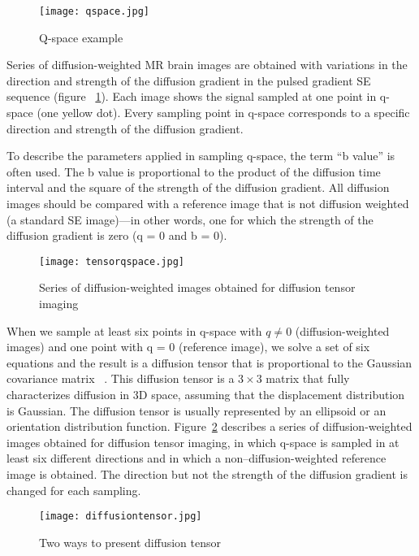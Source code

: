 \begin{figure} 
  \centering 
  \texttt{[image: qspace.jpg]}
  \caption{Q-space example}
  \label{Fig:qspace}
\end{figure}

Series of diffusion-weighted MR brain images are obtained with variations in the direction and strength of the diffusion gradient in the pulsed gradient SE sequence (figure ~\ref{Fig:qspace}). Each image shows the signal sampled at one point in q-space (one yellow dot). Every sampling point in q-space corresponds to a specific direction and strength of the diffusion gradient.

To describe the parameters applied in sampling q-space, the term “b value” is often used. The b value is proportional to the product of the diffusion time interval and the square of the strength of the diffusion gradient. All diffusion images should be compared with a reference image that is not diffusion weighted (a standard SE image)—in other words, one for which the strength of the diffusion gradient is zero (q = 0 and b = 0).

\begin{figure} 
  \centering 
  \texttt{[image: tensorqspace.jpg]}
  \caption{Series of diffusion-weighted images obtained for diffusion tensor imaging}
  \label{Fig:tensor_qspace}
\end{figure}

When we sample at least six points in q-space with $q\neq0$  (diffusion-weighted images) and one point with q = 0 (reference image), we solve a set of six equations and the result is a diffusion tensor that is proportional to the Gaussian covariance matrix ~\cite{bihan2001tensor}. This diffusion tensor is a $3 \times 3$ matrix that fully characterizes diffusion in 3D space, assuming that the displacement distribution is Gaussian. The diffusion tensor is usually represented by an ellipsoid or an orientation distribution function. Figure~\ref{Fig:tensor_qspace} describes a series of diffusion-weighted images obtained for diffusion tensor imaging, in which q-space is sampled in at least six different directions and in which a non–diffusion-weighted reference image is obtained. The direction but not the strength of the diffusion gradient is changed for each sampling. 

\begin{figure} 
  \centering 
  \texttt{[image: diffusiontensor.jpg]}
  \caption{Two ways to present diffusion tensor}
  \label{Fig:diffusion_tensor}
\end{figure}


